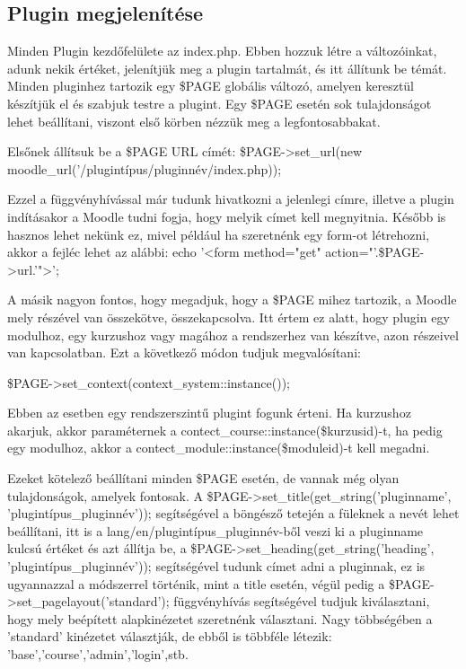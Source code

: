 \subsection{Plugin megjelenítése}

Minden Plugin kezdőfelülete az index.php. Ebben hozzuk létre a változóinkat, adunk nekik értéket, jelenítjük meg a plugin tartalmát, és itt állítunk be témát. Minden pluginhez tartozik egy \$PAGE globális változó, amelyen keresztül készítjük el és szabjuk testre a plugint. Egy \$PAGE esetén sok tulajdonságot lehet beállítani, viszont első körben nézzük meg a legfontosabbakat. \par
Elsőnek állítsuk be a \$PAGE URL címét: 
\hfill \break
\$PAGE->set\_url(new moodle\_url('/plugintípus/pluginnév/index.php));
\hfill \break

Ezzel a függvényhívással már tudunk hivatkozni a jelenlegi címre, illetve a plugin indításakor a Moodle tudni fogja, hogy melyik címet kell megnyitnia. Később is hasznos lehet nekünk ez, mivel például ha szeretnénk egy form-ot létrehozni, akkor a fejléc lehet az alábbi:
\hfill \break
echo '<form method="get" action="'.\$PAGE->url.'">';
\hfill \break

A másik nagyon fontos, hogy megadjuk, hogy a \$PAGE mihez tartozik, a Moodle mely részével van összekötve, összekapcsolva. Itt értem ez alatt, hogy plugin egy modulhoz, egy kurzushoz vagy magához a rendszerhez van készítve, azon részeivel van kapcsolatban. Ezt a következő módon tudjuk megvalósítani:

\hfill \break
\$PAGE->set\_context(context\_system::instance());
\hfill \break

Ebben az esetben egy rendszerszintű plugint fogunk érteni. Ha kurzushoz akarjuk, akkor paraméternek a contect\_course::instance(\$kurzusid)-t, ha pedig egy modulhoz, akkor a contect\_module::instance(\$moduleid)-t kell megadni. \par

Ezeket kötelező beállítani minden \$PAGE esetén, de vannak még olyan tulajdonságok, amelyek fontosak. A
\hfill \break
\$PAGE->set\_title(get\_string('pluginname', 'plugintípus\_pluginnév'));
\hfill \break
segítségével a böngésző tetején a füleknek a nevét lehet beállítani, itt is a lang/en/plugintípus\_pluginnév-ből veszi ki a pluginname kulcsú értéket és azt állítja be, a 
\hfill \break
\$PAGE->set\_heading(get\_string('heading', 'plugintípus\_pluginnév'));
\hfill \break
segítségével tudunk címet adni a pluginnak, ez is ugyannazzal a módszerrel történik, mint a title esetén, végül pedig a
\hfill \break
\$PAGE->set\_pagelayout('standard');
\hfill \break
függvényhívás segítségével tudjuk kiválasztani, hogy mely beépített alapkinézetet szeretnénk választani. Nagy többségében a 'standard' kinézetet választják, de ebből is többféle létezik: 'base','course','admin','login',stb. \par

